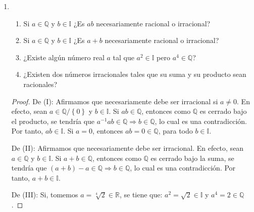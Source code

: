 \documentclass[12pt]{article}
\begin{document}
\begin{enumerate}
\begin{proof}
\begin{equation*}
\begin{split}
            \end{split}
        \end{equation*}
        Como el $a$ fue arbitrario y el $b$ es fijo, entonces $\sup(A+B)-b$ es cota superior de $a$, por minimalidad debe suceder que $\sup A \leq \sup (A+B) - b$. Como el $b$ fue arbitrario, entonces:
        \begin{equation*}
            b\leq \sup(A+B)-\sup A
        \end{equation*}
        Por tanto $\sup B \leq \sup (A+B) - \sup A$. Así $\sup A+ \sup B \leq \sup (A+B)$. Como antes se tenía la otra desigualdad, debe suceder que $\sup (A+B) = \sup A + \sup B$.
        \qed
    \end{proof}
    \item \begin{enumerate}
        \item Si $a\in\mathbb{Q}$ y $b\in\mathbb{I}$ ¿Es $ab$ necesariamente racional o irracional?
        \item Si $a\in\mathbb{Q}$ y $b\in\mathbb{I}$ ¿Es $a+b$ necesariamente racional o irracional?
        \item ¿Existe algún número real $a$ tal que $a^2\in\mathbb{I}$ pero $a^4\in\mathbb{Q}$?
        \item ¿Existen dos números irracionales tales que su suma y su producto sean racionales?
    \end{enumerate}
    \begin{proof}
        De (I): Afirmamos que necesariamente debe ser irracional si $a\neq0$. En efecto, sean $a\in\mathbb{Q}/\left\{0\right\}$ y $b\in\mathbb{I}$. Si $ab\in\mathbb{Q}$, entonces como $\mathbb{Q}$ es cerrado bajo el producto, se tendría que $a^{-1}ab\in\mathbb{Q}\Rightarrow b\in\mathbb{Q}$, lo cual es una contradicción. Por tanto, $ab\in\mathbb{I}$. Si $a=0$, entonces $ab=0\in\mathbb{Q}$, para todo $b\in\mathbb{I}$.
        
        De (II): Afirmamos que necesariamente debe ser irracional. En efecto, sean $a\in\mathbb{Q}$ y $b\in\mathbb{I}$. Si $a+b\in\mathbb{Q}$, entonces como $\mathbb{Q}$ es cerrado bajo la suma, se tendría que $(a+b)-a\in\mathbb{Q}\Rightarrow b\in\mathbb{Q}$, lo cual es una contradicción. Por tanto, $a+b\in\mathbb{I}$.

        De (III): Si, tomemos $a=\sqrt[4]{2}\in\mathbb{R}$, se tiene que: $a^2=\sqrt{2}\in\mathbb{I}$ y $a^4=2\in\mathbb{Q}$.


\end{proof}
\end{enumerate}
\end{document}

